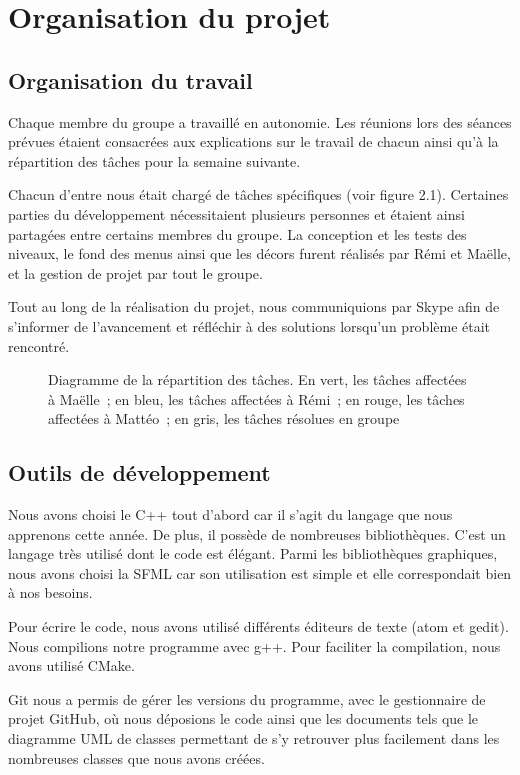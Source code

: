 \chapter{Organisation du projet}

\section{Organisation du travail}

Chaque membre du groupe a travaillé en autonomie. Les réunions lors des séances
prévues étaient consacrées aux explications sur le travail de chacun ainsi qu'à
la répartition des tâches pour la semaine suivante.

Chacun d'entre nous était chargé de tâches spécifiques (voir figure 2.1).
Certaines parties du développement nécessitaient plusieurs personnes et
étaient ainsi partagées entre certains membres du groupe. La conception
et les tests des niveaux, le fond des menus ainsi que les décors furent
réalisés par Rémi et Maëlle, et la gestion de projet par tout le groupe.

Tout au long de la réalisation du projet, nous communiquions par Skype
afin de s'informer de l'avancement et réfléchir à des solutions lorsqu'un
problème était rencontré.

\begin{figure}[p!]
    
    \caption{
        Diagramme de la répartition des tâches. En vert, les tâches
        affectées à Maëlle~; en bleu, les tâches affectées à Rémi~;
        en rouge, les tâches affectées à Mattéo~; en gris, les
        tâches résolues en groupe
    }
    \label{fig:organisation-gantt}
\end{figure}
\restoregeometry

\section{Outils de développement}

Nous avons choisi le C++ tout d'abord car il s'agit du langage que nous
apprenons cette année. De plus, il possède de nombreuses bibliothèques.
C'est un langage très utilisé dont le code est élégant. Parmi les bibliothèques
graphiques, nous avons choisi la SFML car son utilisation est simple et
elle correspondait bien à nos besoins.

Pour écrire le code, nous avons utilisé différents éditeurs de texte
(atom et gedit). Nous compilions notre programme avec g++. Pour faciliter
la compilation, nous avons utilisé CMake.

Git nous a permis de gérer les versions du programme, avec le gestionnaire
de projet GitHub, où nous déposions le code ainsi que les documents tels
que le diagramme UML de classes permettant de s'y retrouver plus facilement
dans les nombreuses classes que nous avons créées.
